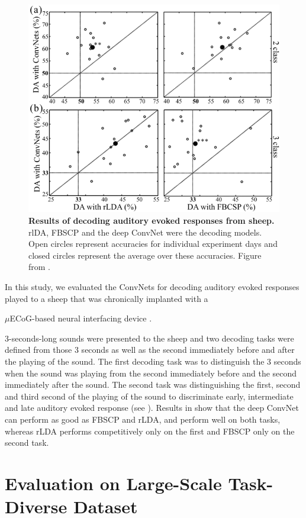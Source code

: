 \begin{figure}[htb]
    \myfloatalign
    \includegraphics[width=0.65\linewidth]{images/sheep-accuracies.png}
    \caption[Results of decoding auditory evoked responses]{
\textbf{Results of decoding auditory evoked responses from sheep.}
rlDA, FBSCP and the deep ConvNet were the decoding models. Open circles represent accuracies for individual experiment days and closed circles represent the average
over these accuracies. Figure from \citet{wangsheep}.
}
\label{sheep-accuracies-fig}
\end{figure}



    In this study, we evaluated the ConvNets for decoding auditory evoked
responses played to a sheep that was chronically implanted with a 

$\mu$ECoG-based neural interfacing device \cite{wangsheep}.

3-seconds-long sounds were presented to the sheep and two decoding tasks
were defined from those 3 seconds as well as the second immediately
before and after the playing of the sound. The first decoding task was
to distinguish the 3 seconds when the sound was playing from the second
immediately before and the second immediately after the sound. The
second task was distinguishing the first, second and third second of the
playing of the sound to discriminate early, intermediate and late
auditory evoked response (see ).
Results in  show that the deep
ConvNet can perform as good as FBSCP and rLDA, and perform well on both
tasks, whereas rLDA performs competitively only on the first and FBSCP
only on the second task.

\section{Evaluation on Large-Scale Task-Diverse
Dataset}\label{evaluation-on-large-scale-task-diverse-dataset}


